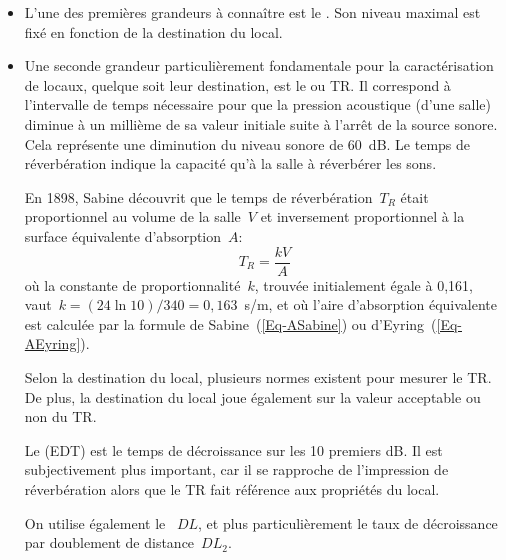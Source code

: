 {\begin{itemize}
   \item L'une des premières grandeurs à connaître est le . Son niveau maximal est fixé en fonction de la destination du local.

   \item Une seconde grandeur particulièrement fondamentale pour la caractérisation de locaux, quelque soit leur destination, est le  ou TR.  Il correspond à l'intervalle de temps nécessaire pour que la pression acoustique (d'une salle) diminue à un millième de sa valeur initiale suite à l'arrêt de la source sonore. Cela représente une diminution du niveau sonore de 60~dB. Le temps de réverbération indique la capacité qu'à la salle à réverbérer les sons.
   
En 1898, Sabine découvrit que le temps de réverbération~$T_R$ était proportionnel au volume de la salle~$V$ et inversement proportionnel à la surface équivalente d'absorption~$A$:
   \begin{equation}
    T_R = \frac{k V}{A} 
   \end{equation}
où la constante de proportionnalité~$k$, trouvée initialement égale à 0,161, vaut~$k=(24\ln10)/340 =0,163$~s/m, et où l'aire d'absorption équivalente est calculée par la formule de Sabine~(\ref{Eq-ASabine}) ou d'Eyring~(\ref{Eq-AEyring}).

Selon la destination du local, plusieurs normes existent pour mesurer le TR. De plus, la destination du local joue également sur la valeur acceptable ou non du TR.

Le  (EDT) est le temps de décroissance sur les 10 premiers dB. Il est subjectivement plus important, car il se rapproche de l'impression de réverbération alors que le TR fait référence aux propriétés du local.

   On utilise également le ~$DL$, et plus particulièrement le taux de décroissance par doublement de distance~$DL_2$.


\end{itemize}}
